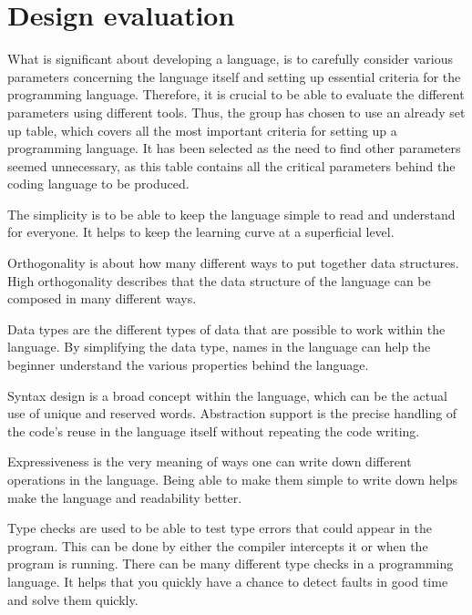 \section{Design evaluation} \label{chap:design evaluation}
What is significant about developing a language, is to carefully consider various parameters concerning the language itself and setting up essential criteria for the programming language. 
Therefore, it is crucial to be able to evaluate the different parameters using different tools. Thus, the group has chosen to use an already set up table, which covers all the most important criteria for setting up a programming language. 
It has been selected as the need to find other parameters seemed unnecessary, as this table contains all the critical parameters behind the coding language to be produced.






The simplicity is to be able to keep the language simple to read and understand for everyone. It helps to keep the learning curve at a superficial level.

Orthogonality is about how many different ways to put together data structures. High orthogonality describes that the data structure of the language can be composed in many different ways.

Data types are the different types of data that are possible to work within the language. By simplifying the data type, names in the language can help the beginner understand the various properties behind the language.

Syntax design is a broad concept within the language, which can be the actual use of unique and reserved words.
Abstraction support is the precise handling of the code's reuse in the language itself without repeating the code writing.

Expressiveness is the very meaning of ways one can write down different operations in the language. Being able to make them simple to write down helps make the language and readability better.

Type checks are used to be able to test type errors that could appear in the program. This can be done by either the compiler intercepts it or when the program is running. There can be many different type checks in a programming language. It helps that you quickly have a chance to detect faults in good time and solve them quickly.

